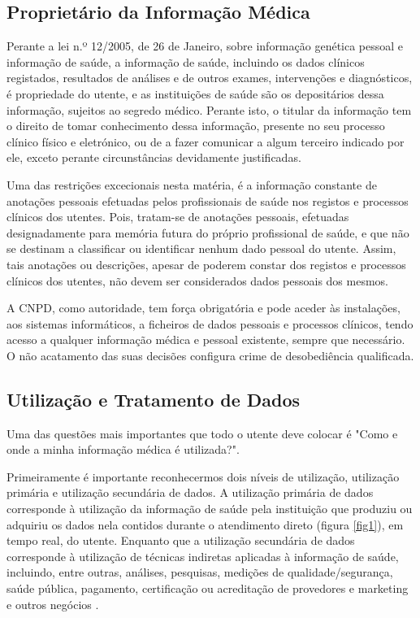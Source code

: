 \documentclass[conference]{IEEEtran}
\begin{document}
\subsection{Proprietário da Informação Médica}

Perante a lei n.º 12/2005, de 26 de Janeiro, sobre informação genética pessoal e informação de saúde, a informação de saúde, incluindo os dados clínicos registados, resultados de análises e de outros exames, intervenções e diagnósticos, é propriedade do utente, e as instituições de saúde são os depositários dessa informação, sujeitos ao segredo médico. Perante isto, o titular da informação tem o direito de tomar conhecimento dessa informação, presente no seu processo clínico físico e eletrónico, ou de a fazer comunicar a algum terceiro indicado por ele, exceto perante circunstâncias devidamente justificadas.

Uma das restrições excecionais nesta matéria, é a informação constante de anotações pessoais efetuadas pelos profissionais de saúde nos registos e processos clínicos dos utentes.
Pois, tratam-se de anotações pessoais, efetuadas designadamente para memória futura do próprio profissional de saúde, e que não se destinam a classificar ou identificar nenhum dado pessoal do utente.
Assim, tais anotações ou descrições, apesar de poderem constar dos registos e processos clínicos dos utentes, não devem ser considerados dados pessoais dos mesmos.

A CNPD, como autoridade, tem força obrigatória e pode aceder às instalações, aos sistemas informáticos, a ficheiros de dados pessoais e processos clínicos, tendo acesso a qualquer informação médica e pessoal existente, sempre que necessário. O não acatamento das suas decisões configura crime de desobediência qualificada.


\subsection{Utilização e Tratamento de Dados}

Uma das questões mais importantes que todo o utente deve colocar é "Como e onde a minha informação médica é utilizada?".

Primeiramente é importante reconhecermos dois níveis de utilização, utilização primária e utilização secundária de dados. A utilização primária de dados corresponde à utilização da informação de saúde pela instituição que produziu ou adquiriu os dados nela contidos durante o atendimento direto (figura \ref{fig1}), em tempo real, do utente. Enquanto que a utilização secundária de dados corresponde à utilização de técnicas indiretas aplicadas à informação de saúde, incluindo, entre outras, análises, pesquisas, medições de qualidade/segurança, saúde pública, pagamento, certificação ou acreditação de provedores e marketing e outros negócios \cite{safran2007toward}.
\end{document}
